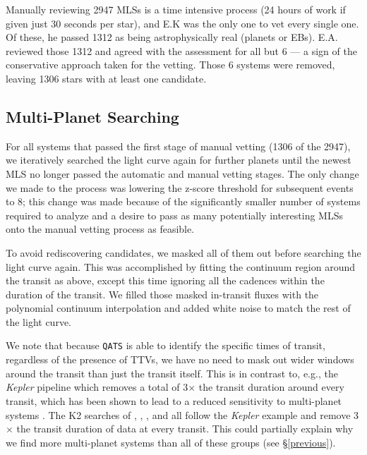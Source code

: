 \documentclass[twocolumn]{aastex62}
\newcommand{\project}[1]{\textsl{#1}}
\newcommand{\pipeline}[1]{\texttt{#1}}
\newcommand{\npassdur}{2947}
\newcommand{\nsystemme}{1312}
\newcommand{\nsystems}{1306}
\newcommand{\ericbad}{6}
\begin{document}
Manually reviewing \npassdur{} MLSs is a time intensive process (24
hours of work if given just 30 seconds per star), and E.K was the only
one to vet every single one. Of these, he passed \nsystemme{} as being
astrophysically real (planets or EBs). E.A. reviewed those
\nsystemme{} and agreed with the assessment for all but \ericbad{} ---
a sign of the conservative approach taken for the vetting. Those
\ericbad{} systems were removed, leaving \nsystems{} stars with at
least one candidate.


\subsection{Multi-Planet Searching}
\label{multi}

For all systems that passed the first stage of manual vetting
(\nsystems{} of the \npassdur{}), we iteratively searched the light
curve again for further planets until the newest MLS no longer passed
the automatic and manual vetting stages. The only change we made to
the process was lowering the z-score threshold for subsequent events
to 8; this change was made because of the significantly smaller number
of systems required to analyze and a desire to pass as many
potentially interesting MLSs onto the manual vetting process as
feasible.

To avoid rediscovering candidates, we masked all of them out before
searching the light curve again. This was accomplished by fitting the
continuum region around the transit as above, except this time
ignoring all the cadences within the duration of the transit. We
filled those masked in-transit fluxes with the polynomial continuum
interpolation and added white noise to match the rest of the light
curve.

We note that because \pipeline{QATS} is able to identify the specific
times of transit, regardless of the presence of TTVs, we have no need
to mask out wider windows around the transit than just the transit
itself.  This is in contrast to, e.g., the \project{Kepler} pipeline
which removes a total of 3$\times$ the transit duration around every
transit, which has been shown to lead to a reduced sensitivity to
multi-planet systems \citep{zin19}.  The K2 searches of \cite{cro16},
\cite{pet18}, \cite{van16b}, and \cite{may18} all follow the
\project{Kepler} example and remove 3$\times$ the transit duration of
data at every transit. This could partially explain why we find more
multi-planet systems than all of these groups (see \S\ref{previous}).
\end{document}
